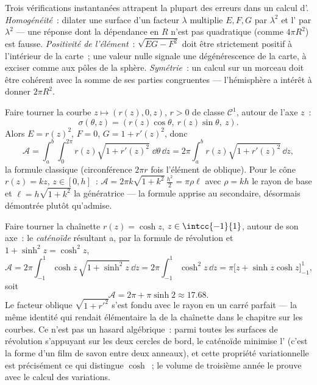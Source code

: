 \begin{remark}
Trois vérifications instantanées attrapent la plupart des erreurs
dans un calcul d'. \emph{Homogénéité}~: dilater une surface
d'un facteur $\lambda$ multiplie $E, F, G$ par $\lambda^2$ et
l' par $\lambda^2$ --- une réponse dont la dépendance en $R$
n'est pas quadratique (comme $4\pi R^2$) est fausse. \emph{Positivité de
l'élément}~: $\sqrt{EG - F^2}$ doit être strictement positif à
l'intérieur de la carte~; une valeur nulle signale une
dégénérescence de la carte, à exciser comme aux pôles de la
sphère. \emph{Symétrie}~: un calcul sur un morceau  doit
être cohérent avec la somme de ses parties congruentes ---
l'hémisphère a intérêt à donner $2\pi R^2$.
\end{remark}

\begin{example}\label{ex:b2:surfaces:revolution}
Faire tourner la courbe $z \mapsto (r(z), 0, z)$, $r > 0$ de classe
$\mathcal{C}^1$, autour de l'axe $z$~:
\[
\sigma(\theta, z) = (r(z)\cos\theta,\ r(z)\sin\theta,\ z).
\]
Alors $E = r(z)^2$, $F = 0$, $G = 1 + r'(z)^2$, donc
\[
\mathcal{A} = \int_a^b\!\!\int_0^{2\pi}
r(z)\sqrt{1 + r'(z)^2}\;\dd\theta\,\dd z
= 2\pi\int_a^b r(z)\sqrt{1 + r'(z)^2}\,\dd z ,
\]
la formule classique (circonférence $2\pi r$ fois l'élément de
 oblique). Pour le cône $r(z) = kz$, $z \in [0, h]$~: $\mathcal
A = 2\pi k\sqrt{1 + k^2}\,\frac{h^2}{2} = \pi \rho \ell$ avec
$\rho = kh$ le rayon de base et $\ell = h\sqrt{1 + k^2}$ la
génératrice --- la formule apprise au secondaire, désormais
démontrée plutôt qu'admise.
\end{example}

\begin{example}[Le caténoïde]\label{ex:b2:surfaces:catenoid}
Faire tourner la chaînette $r(z) = \cosh z$, $z \in \intcc{-1}{1}$,
autour de son axe~: le \emph{caténoïde} résultant a, par la
formule de révolution et $1 + \sinh^2 z = \cosh^2 z$,
\[
\mathcal A = 2\pi\int_{-1}^1\cosh z\,\sqrt{1 + \sinh^2z}\,
\dd z = 2\pi\int_{-1}^1\cosh^2z\,\dd z
= \pi\bigl[z + \sinh z\cosh z\bigr]_{-1}^{1},
\]
soit
\[
\mathcal A = 2\pi + \pi\sinh 2 \approx 17.68 .
\]
Le facteur oblique $\sqrt{1 + r'^2}$ s'est fondu avec le rayon
en un carré parfait --- la même identité qui rendait élémentaire
la  de la chaînette dans le chapitre sur les
courbes. Ce n'est pas un hasard algébrique~: parmi toutes les
surfaces de révolution s'appuyant sur les deux cercles de bord,
le caténoïde minimise l' (c'est la forme d'un film de savon
entre deux anneaux), et cette propriété variationnelle est
précisément ce qui distingue $\cosh$~; le volume de troisième
année le prouve avec le calcul des variations.
\end{example}

